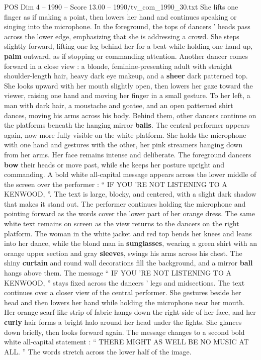 \begin{textsample}{POS Dim 4 – 1990 – Score 13.00 – 1990/tv\_com\_1990\_30.txt}
She lifts one finger as if making a point, then lowers her hand and continues speaking or singing into the microphone.
In the foreground, the tops of dancers ’ heads pass across the lower edge, emphasizing that she is addressing a crowd.
She steps slightly forward, lifting one leg behind her for a beat while holding one hand up, \textbf{palm} outward, as if stopping or commanding attention.
Another dancer comes forward in a close view : a blonde, feminine-presenting adult with straight shoulder-length hair, heavy dark eye makeup, and a \textbf{sheer} dark patterned top.
She looks upward with her mouth slightly open, then lowers her gaze toward the viewer, raising one hand and moving her finger in a small gesture.
To her left, a man with dark hair, a moustache and goatee, and an open patterned shirt dances, moving his arms across his body.
Behind them, other dancers continue on the platforms beneath the hanging mirror \textbf{balls}.
The central performer appears again, now more fully visible on the white platform.
She holds the microphone with one hand and gestures with the other, her pink streamers hanging down from her arms.
Her face remains intense and deliberate.
The foreground dancers \textbf{bow} their heads or move past, while she keeps her posture upright and commanding.
A bold white all-capital message appears across the lower middle of the screen over the performer : “ IF YOU ’RE NOT LISTENING TO A KENWOOD, ”.
The text is large, blocky, and centered, with a slight dark shadow that makes it stand out.
The performer continues holding the microphone and pointing forward as the words cover the lower part of her orange dress.
The same white text remains on screen as the view returns to the dancers on the right platform.
The woman in the white jacket and red top bends her knees and leans into her dance, while the blond man in \textbf{sunglasses}, wearing a green shirt with an orange upper section and gray \textbf{sleeves}, swings his arms across his chest.
The shiny \textbf{curtain} and round wall decorations fill the background, and a mirror \textbf{ball} hangs above them.
The message “ IF YOU ’RE NOT LISTENING TO A KENWOOD, ” stays fixed across the dancers ’ legs and midsections.
The text continues over a closer view of the central performer.
She gestures beside her head and then lowers her hand while holding the microphone near her mouth.
Her orange scarf-like strip of fabric hangs down the right side of her face, and her \textbf{curly} hair forms a bright halo around her head under the lights.
She glances down briefly, then looks forward again.
The message changes to a second bold white all-capital statement : “ THERE MIGHT AS WELL BE NO MUSIC AT ALL. ” The words stretch across the lower half of the image.

\end{textsample}
